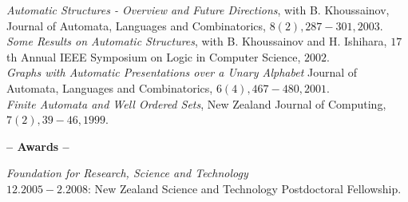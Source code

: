 \documentclass[a4paper]{article}
\def\tit#1{\medskip \begin{center}  {\Large {\bf -- #1 -- }} \end{center}}
\begin{document}
{\it Automatic Structures - Overview and Future Directions}, with 
B. Khoussainov,
Journal of Automata, Languages and Combinatorics, $8(2), 287-301, 2003$. \\

{\it Some Results on Automatic Structures}, with B. Khoussainov
and H. Ishihara, $17$th Annual IEEE Symposium on Logic in Computer Science,
$2002$. \\

{\it Graphs with Automatic Presentations over a Unary Alphabet}
Journal of Automata, Languages and Combinatorics, $6(4), 467-480, 2001$. \\

{\it Finite Automata and Well Ordered Sets},
New Zealand Journal of Computing, $7(2), 39-46, 1999$. 

%
%
% 
%
%
%

\iffalse

{\it Finite Automata and Algebraic Structures},
with Bakhadyr Khoussainov, 
Abstracts of Symposium on Logic and Applications, Novosibirsk, May $2000$. \\

{\it On Automata Presentable Structures},
with Bakhadyr Khoussainov, 
Abstracts of papers presented to the American Mathematical Society, 
$20(2), 1999$. \\ 
\fi



\tit{Awards}

{\em Foundation for Research, Science and Technology}\\ 
$12.2005-2.2008$: New Zealand Science and Technology Postdoctoral Fellowship.\\ 
\end{document}
